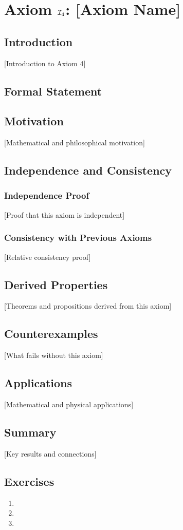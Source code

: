 \chapter{Axiom $\mathcal{I}_4$: [Axiom Name]}
\label{ch:axiom-I4}

\section{Introduction}
[Introduction to Axiom 4]

\section{Formal Statement}
\begin{axiom}
\end{axiom}

\section{Motivation}
[Mathematical and philosophical motivation]

\section{Independence and Consistency}
\subsection{Independence Proof}
[Proof that this axiom is independent]

\subsection{Consistency with Previous Axioms}
[Relative consistency proof]

\section{Derived Properties}
[Theorems and propositions derived from this axiom]

\section{Counterexamples}
[What fails without this axiom]

\section{Applications}
[Mathematical and physical applications]

\section{Summary}
[Key results and connections]

\section{Exercises}
\begin{enumerate}
\item [Exercise 1]
\item [Exercise 2]
\item [Exercise 3]
\end{enumerate}

